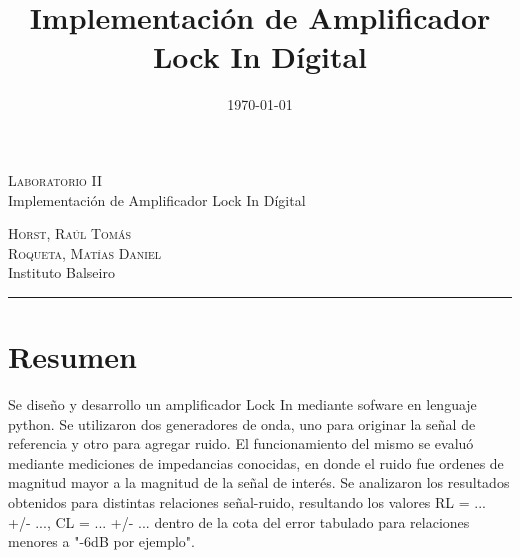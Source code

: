 \documentclass[11pt,a4paper]{extarticle}
\date{\small{\today}}
\begin{document}
\title{Implementación de Amplificador Lock In Dígital}
	\LARGE{\textsc{Laboratorio II}}\\
	\Large{Implementación de Amplificador Lock In Dígital}\\
\begin{large}
\small\textsc{Horst, Raúl Tomás}\\
\small\textsc{Roqueta, Matías Daniel}\\
\small{Instituto Balseiro}\\
\end{large}
\setcounter{page}{1}

\chead{}

\rfoot{\thepage} 
\renewcommand{\headrulewidth}{0.4pt} 
\renewcommand{\footrulewidth}{0.4pt} 
\pagestyle{fancy}

\hrule

\normalsize
\section{Resumen}
Se diseño y desarrollo un amplificador Lock In 
mediante sofware en lenguaje python. 
Se utilizaron dos generadores de onda, uno para originar 
la señal de referencia y otro para agregar ruido. 
El funcionamiento del mismo se evaluó mediante 
mediciones de impedancias conocidas, en donde el ruido 
fue ordenes de magnitud mayor a la magnitud de la señal 
de interés. Se analizaron los
resultados obtenidos para distintas relaciones 
señal-ruido, resultando los valores RL = ... +/- ...,
 CL = ... +/- ... dentro de
la cota del error tabulado para relaciones menores a 
"-6dB por ejemplo".
\end{document}
